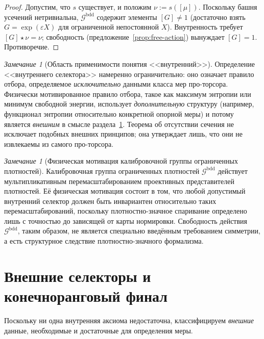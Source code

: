 \documentclass[12pt,a4paper]{article}
\theoremstyle{plain}
\theoremstyle{definition}
\theoremstyle{remark}
\newtheorem{remark}[theorem]{Замечание}
\newcommand{\cG}{\mathcal{G}}
\begin{document}
\begin{proof}
Допустим, что $s$ существует, и положим $\nu := s([\mu])$.
Поскольку башня усечений нетривиальна, $\cG^{\mathrm{bdd}}$
содержит элементы $[G] \ne 1$ (достаточно взять
$G = \exp(\varepsilon X)$ для ограниченной непостоянной $X$).
Внутренность требует $[G]\star\nu = \nu$; свободность
(предложение~\ref{prop:free-action}) вынуждает $[G] = 1$.
Противоречие.
\end{proof}

\begin{remark}[Область применимости понятия <<внутренний>>]
\label{rem:internal-scope}
Определение <<внутреннего селектора>> намеренно ограничительно:
оно означает правило отбора, определяемое \emph{исключительно}
данными класса мер про-торсора.  Физически мотивированное правило
отбора, такое как максимум энтропии или минимум свободной энергии,
использует \emph{дополнительную} структуру (например, функционал
энтропии относительно конкретной опорной меры) и потому является
\emph{внешним} в смысле раздела~\ref{sec:external}.  Теорема
об отсутствии сечения не исключает подобных внешних принципов;
она утверждает лишь, что они не извлекаемы из самого про-торсора.
\end{remark}

\begin{remark}[Физическая мотивация калибровочной группы ограниченных плотностей]
\label{rem:gauge-motivation}
Калибровочная группа ограниченных плотностей $\cG^{\mathrm{bdd}}$
действует мультипликативным перемасштабированием проективных
представителей плотностей.  Её физическая мотивация состоит в том,
что любой допустимый внутренний селектор должен быть инвариантен
относительно таких перемасштабирований, поскольку плотностно-значное
спаривание определено лишь с точностью до зависящей от карты
нормировки.  Свободность действия $\cG^{\mathrm{bdd}}$, таким
образом, не является специально введённым требованием симметрии,
а есть структурное следствие плотностно-значного формализма.
\end{remark}


\section{Внешние селекторы и конечноранговый финал}
\label{sec:external}

Поскольку ни одна внутренняя аксиома недостаточна, классифицируем
\emph{внешние} данные, необходимые и достаточные для определения меры.
\end{document}
